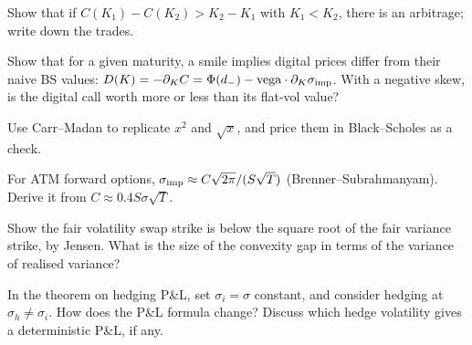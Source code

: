 \begin{exercises}
\item Show that if $C(K_1)-C(K_2)>K_2-K_1$ with $K_1<K_2$, there is an arbitrage; write down the trades.
\item Show that for a given maturity, a smile implies digital prices differ from their naive BS values: $D(K)=-\partial_KC=\Phi(d_-)-\text{vega}\cdot\partial_K\sigma_{\rm imp}$. With a negative skew, is the digital call worth more or less than its flat-vol value?
\item Use Carr--Madan to replicate $x^2$ and $\sqrt x$, and price them in Black--Scholes as a check.
\item For ATM forward options, $\sigma_{\rm imp}\approx C\sqrt{2\pi}/(S\sqrt T)$ (Brenner--Subrahmanyam). Derive it from $C\approx0.4S\sigma\sqrt T$.
\item Show the fair volatility swap strike is below the square root of the fair variance strike, by Jensen. What is the size of the convexity gap in terms of the variance of realised variance?
\item In the theorem on hedging P\&L, set $\sigma_i=\sigma$ constant, and consider hedging at $\sigma_h\ne\sigma_i$. How does the P\&L formula change? Discuss which hedge volatility gives a deterministic P\&L, if any.
\end{exercises}
